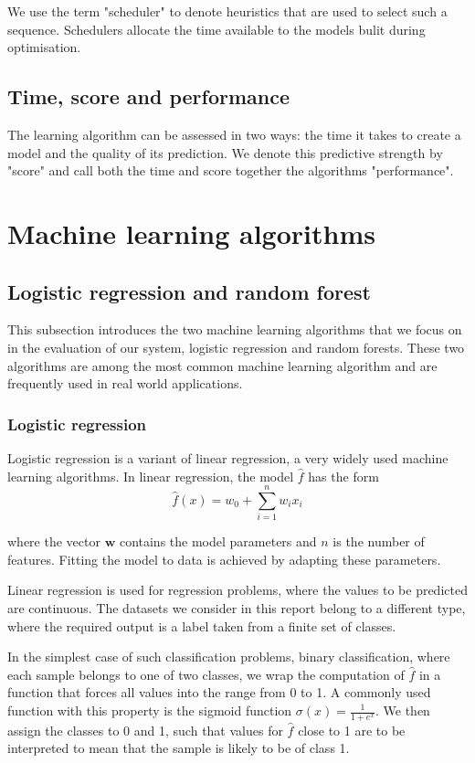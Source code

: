 \documentclass[a4paper,12pt,twoside,openright]{report}
\begin{document}
We use the term "scheduler" to denote heuristics that are used to select such a sequence. Schedulers allocate the time available to the models bulit during optimisation.

\subsection{Time, score and performance}
The learning algorithm can be assessed in two ways: the time it takes to create a model and the quality of its prediction. We denote this predictive strength by "score" and call both the time and score together the algorithms "performance".

\section{Machine learning algorithms}
\subsection{Logistic regression and random forest}
This subsection introduces the two machine learning algorithms that we focus on in the evaluation of our system, logistic regression and random forests. These two algorithms are among the most common machine learning algorithm and are frequently used in real world applications.

\subsubsection{Logistic regression}
Logistic regression is a variant of linear regression, a very widely used machine learning algorithms. In linear regression, the model $\hat{f}$ has the form
\begin{equation}
\hat{f}(x) = w_0 + \sum_{i=1}^n w_ix_i
\end{equation}

where the vector $\mathbf{w}$ contains the model parameters and $n$ is the number of features. Fitting the model to data is achieved by adapting these parameters.

Linear regression is used for regression problems, where the values to be predicted are continuous. The datasets we consider in this report belong to a different type, where the required output is a label taken from a finite set of classes.

In the simplest case of such classification problems, binary classification, where each sample belongs to one of two classes, we wrap the computation of $\hat{f}$ in a function that forces all values into the range from 0 to 1. A commonly used function with this property is the sigmoid function $\sigma(x) = \frac{1}{1+e^x}$. We then assign the classes to 0 and 1, such that values for $\hat{f}$ close to 1 are to be interpreted to mean that the sample is likely to be of class 1.
\end{document}
